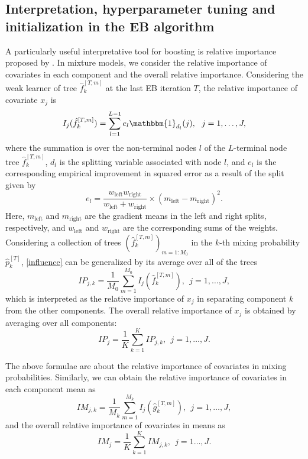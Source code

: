 \documentclass[11pt]{article}
\numberwithin{equation}{section}
\begin{document}
\subsection{Interpretation, hyperparameter tuning and initialization in the EB algorithm}
A particularly useful interpretative tool for boosting is relative importance proposed by \cite{breiman1983classification}.
In mixture models, we consider the relative importance of covariates in each component and the overall relative importance.
Considering the weak learner of tree $\hat{f}_k^{[T,m]}$ at the last EB iteration $T$,  the relative importance of covariate $x_j$ is
\begin{equation}\label{influence}
	I_j(\hat{f}_k^{[T,m]})=\sum_{l=1}^{L-1}{e}_l\mathbbm{1}_{d_l}(j), ~~ j=1,\ldots,J,
\end{equation}
where the summation is over the non-terminal nodes $l$ of the $L$-terminal node tree $\hat{f}^{[T,m]}_k$, $d_l$ is the splitting variable associated with node $l$, and $e_l$ is the corresponding empirical improvement in squared error as a result of the split given by 
$$e_l=\frac{w_\text{left}w_\text{right}}{w_\text{left}+w_\text{right}}\times(m_\text{left}-m_\text{right})^2.$$
Here, $m_\text{left}$ and $m_\text{right}$ are the gradient means in the left and right splits, respectively, 
and $w_\text{left}$ and $w_\text{right}$ are the corresponding sums of the weights.
Considering a collection of trees $(\hat{f}^{[T,m]}_k)_{m=1:M_0}$ in the $k$-th mixing probability $\hat{p}_k^{[T]}$, \eqref{influence} can be generalized by its average over all of the trees
\begin{equation}
	IP_{j,k}=\frac{1}{M_0}\sum_{m=1}^{M_0} I_j(\hat{f}_k^{[T,m]}), ~~ j=1,\ldots,J,
\end{equation}
which is interpreted as the relative importance of $x_j$ in separating component $k$ from the other components.
The overall relative importance of $x_j$ is obtained by averaging over all components:
$$
IP_{j}=\frac{1}{K}\sum_{k=1}^K IP_{j,k}, ~~ j=1,\ldots,J.
$$

The above formulae are about the relative importance of covariates in mixing probabilities. Similarly, we can obtain the relative importance of covariates in each component mean as
\begin{equation}
	IM_{j,k}=\frac{1}{M_k}\sum_{m=1}^{M_k} I_j(\hat{g}_k^{[T,m]}),~~ j=1,\ldots,J,
\end{equation}
and the overall relative importance of covariates in means as
$$
IM_{j}=\frac{1}{K}\sum_{k=1}^K IM_{j,k}, ~~j=1\ldots,J.
$$
\end{document}
